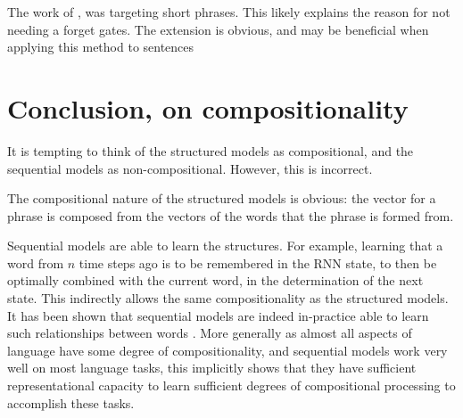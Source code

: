 \documentclass[12pt,parskip]{komatufte}
\begin{document}
\begin{figure}
\begin{adjustbox}{max width=\textwidth}
	\end{adjustbox}
\end{figure}

The work of \textcite{rui2017mvrusemantic}, was targeting short phrases.
This likely explains the reason for not needing a forget gates.
The extension is obvious, and may be beneficial when applying this method to sentences 


\section{Conclusion, on compositionality}
It is tempting to think of the structured models as compositional,
and the sequential models as non-compositional.
However, this is incorrect.

The compositional nature of the structured models is obvious:
the vector for a phrase is composed from the vectors of the words that the phrase is formed from.

Sequential models are able to learn  the structures.
For example, learning that a word from $n$ time steps ago is to be remembered in the RNN state, to then be optimally combined with the current word, in the determination of the next state.
This indirectly allows the same compositionality as the structured models.
It has been shown that sequential models are indeed in-practice able to learn such relationships between words .
More generally as almost all aspects of language have some degree of compositionality, and sequential models work very well on most language tasks, this implicitly shows that they have sufficient representational capacity to learn sufficient degrees of compositional processing to accomplish these tasks.
\end{document}
